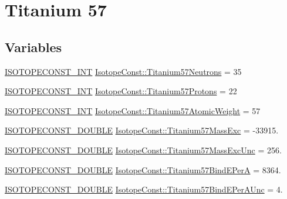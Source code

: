 \hypertarget{group___isotope_const-_titanium-_ti57}{}\section{Titanium 57}
\label{group___isotope_const-_titanium-_ti57}
\subsection*{Variables}
\begin{DoxyCompactItemize}
\item 
\mbox{\hyperlink{group___isotope_const-_macros_ga5f18360b3e99483a35c32d789e62621c}{I\+S\+O\+T\+O\+P\+E\+C\+O\+N\+S\+T\+\_\+\+I\+NT}} \mbox{\hyperlink{group___isotope_const-_titanium-_ti57_gac5ecba77e2884e314c5870fad3fb31ba}{Isotope\+Const\+::\+Titanium57\+Neutrons}} = 35
\item 
\mbox{\hyperlink{group___isotope_const-_macros_ga5f18360b3e99483a35c32d789e62621c}{I\+S\+O\+T\+O\+P\+E\+C\+O\+N\+S\+T\+\_\+\+I\+NT}} \mbox{\hyperlink{group___isotope_const-_titanium-_ti57_ga0043320b09d2a7ccc7a0275f7052da9a}{Isotope\+Const\+::\+Titanium57\+Protons}} = 22
\item 
\mbox{\hyperlink{group___isotope_const-_macros_ga5f18360b3e99483a35c32d789e62621c}{I\+S\+O\+T\+O\+P\+E\+C\+O\+N\+S\+T\+\_\+\+I\+NT}} \mbox{\hyperlink{group___isotope_const-_titanium-_ti57_gaa0f96137950ffc844027d1ee69fc7506}{Isotope\+Const\+::\+Titanium57\+Atomic\+Weight}} = 57
\item 
\mbox{\hyperlink{group___isotope_const-_macros_ga8f45a7272ce02c0b4c65c44636ed719a}{I\+S\+O\+T\+O\+P\+E\+C\+O\+N\+S\+T\+\_\+\+D\+O\+U\+B\+LE}} \mbox{\hyperlink{group___isotope_const-_titanium-_ti57_gae07cbe637db06dc238e3df63ca485c3d}{Isotope\+Const\+::\+Titanium57\+Mass\+Exc}} = -\/33915.
\item 
\mbox{\hyperlink{group___isotope_const-_macros_ga8f45a7272ce02c0b4c65c44636ed719a}{I\+S\+O\+T\+O\+P\+E\+C\+O\+N\+S\+T\+\_\+\+D\+O\+U\+B\+LE}} \mbox{\hyperlink{group___isotope_const-_titanium-_ti57_ga575b386116b7949d0199536908033218}{Isotope\+Const\+::\+Titanium57\+Mass\+Exc\+Unc}} = 256.
\item 
\mbox{\hyperlink{group___isotope_const-_macros_ga8f45a7272ce02c0b4c65c44636ed719a}{I\+S\+O\+T\+O\+P\+E\+C\+O\+N\+S\+T\+\_\+\+D\+O\+U\+B\+LE}} \mbox{\hyperlink{group___isotope_const-_titanium-_ti57_ga58486134addaf44a120d1ac8082371b7}{Isotope\+Const\+::\+Titanium57\+Bind\+E\+PerA}} = 8364.
\item 
\mbox{\hyperlink{group___isotope_const-_macros_ga8f45a7272ce02c0b4c65c44636ed719a}{I\+S\+O\+T\+O\+P\+E\+C\+O\+N\+S\+T\+\_\+\+D\+O\+U\+B\+LE}} \mbox{\hyperlink{group___isotope_const-_titanium-_ti57_gad11b4bb5ef46a29b66d3c9832ed25377}{Isotope\+Const\+::\+Titanium57\+Bind\+E\+Per\+A\+Unc}} = 4.

\end{DoxyCompactItemize}
